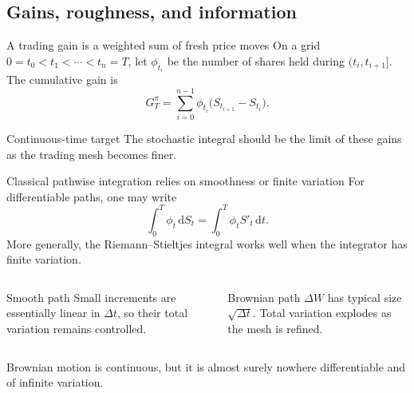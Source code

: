 \documentclass[handout,10pt,aspectratio=169]{beamer}
\newcommand{\dd}{\,\mathrm d}
\begin{document}
\subsection{Gains, roughness, and information}

\begin{frame}{A trading gain is a weighted sum of fresh price moves}
On a grid \(0=t_0<t_1<\cdots<t_n=T\), let \(\phi_{t_i}\) be the number of shares held during \((t_i,t_{i+1}]\).
The cumulative gain is
\[
G_T^\pi=\sum_{i=0}^{n-1}\phi_{t_i}\bigl(S_{t_{i+1}}-S_{t_i}\bigr).
\]
\begin{center}
\end{center}
\begin{block}{Continuous-time target}
The stochastic integral should be the limit of these gains as the trading mesh becomes finer.
\end{block}
\end{frame}

\begin{frame}{Classical pathwise integration relies on smoothness or finite variation}
For differentiable paths, one may write
\[
\int_0^T \phi_t\dd S_t
=\int_0^T \phi_t S'_t\dd t.
\]
More generally, the Riemann--Stieltjes integral works well when the integrator has finite variation.
\begin{columns}[T,onlytextwidth]
\begin{block}{Smooth path}
Small increments are essentially linear in \(\Delta t\), so their total variation remains controlled.
\end{block}
\begin{block}{Brownian path}
\(\Delta W\) has typical size \(\sqrt{\Delta t}\). Total variation explodes as the mesh is refined.
\end{block}
\end{columns}
Brownian motion is continuous, but it is almost surely nowhere differentiable and of infinite variation.
\end{frame}
\end{document}

